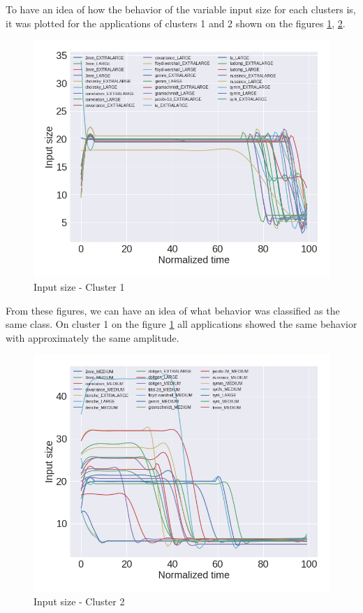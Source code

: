 To have an idea of how the behavior of the variable input size for each clusters is, it was plotted for the applications of clusters 1 and 2 shown on the figures \ref{fig:c1_input_size_0}, \ref{fig:c1_input_size_1}.

\begin{figure}[H]
    \centering
    \includegraphics[width=\textwidth]{fingerprint/figures/cluster_input_0.png}
    \caption{Input size - Cluster 1}
    \label{fig:c1_input_size_0}
\end{figure}

From these figures, we can have an idea of what behavior was classified as the same class. On cluster 1 on the figure \ref{fig:c1_input_size_0} all applications showed the same behavior with approximately the same amplitude.

\begin{figure}[H]
    \centering
    \includegraphics[width=\textwidth]{fingerprint/figures/cluster_input_1.png}
    \caption{Input size - Cluster 2}
    \label{fig:c1_input_size_1}
\end{figure}

